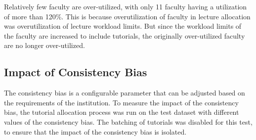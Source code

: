 Relatively few faculty are over-utilized, with only 11 faculty having a utilization of more than 120\%. This is because overutilization of faculty in lecture allocation was overutilization of lecture workload limits. But since the workload limits of the faculty are increased to include tutorials, the originally over-utilized faculty are no longer over-utilized.

\subsection{Impact of Consistency Bias}

The consistency bias is a configurable parameter that can be adjusted based on the requirements of the institution. To measure the impact of the consistency bias, the tutorial allocation process was run on the test dataset with different values of the consistency bias. The batching of tutorials was disabled for this test, to ensure that the impact of the consistency bias is isolated.

